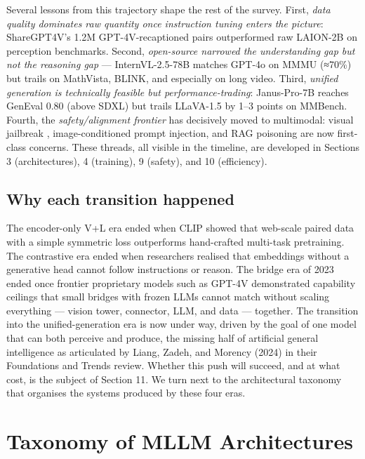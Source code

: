 \documentclass{article}
\begin{document}
Several lessons from this trajectory shape the rest of the survey. First, \emph{data quality dominates raw quantity once instruction tuning enters the picture}: ShareGPT4V's 1.2M GPT-4V-recaptioned pairs \citep{chen20242024} outperformed raw LAION-2B on perception benchmarks. Second, \emph{open-source narrowed the understanding gap but not the reasoning gap} --- InternVL-2.5-78B matches GPT-4o on MMMU (≈70\%) but trails on MathVista, BLINK, and especially on long video. Third, \emph{unified generation is technically feasible but performance-trading}: Janus-Pro-7B reaches GenEval 0.80 (above SDXL) but trails LLaVA-1.5 by 1--3 points on MMBench. Fourth, the \emph{safety/alignment frontier} has decisively moved to multimodal: visual jailbreak \citep{qi20242024}, image-conditioned prompt injection, and RAG poisoning are now first-class concerns. These threads, all visible in the timeline, are developed in Sections 3 (architectures), 4 (training), 9 (safety), and 10 (efficiency).

\subsection{Why each transition happened}\label{why-each-transition-happened}

The encoder-only V+L era ended when CLIP showed that web-scale paired data with a simple symmetric loss outperforms hand-crafted multi-task pretraining. The contrastive era ended when researchers realised that embeddings without a generative head cannot follow instructions or reason. The bridge era of 2023 ended once frontier proprietary models such as GPT-4V demonstrated capability ceilings that small bridges with frozen LLMs cannot match without scaling everything --- vision tower, connector, LLM, and data --- together. The transition into the unified-generation era is now under way, driven by the goal of one model that can both perceive and produce, the missing half of artificial general intelligence as articulated by Liang, Zadeh, and Morency (2024) in their Foundations and Trends review. Whether this push will succeed, and at what cost, is the subject of Section 11. We turn next to the architectural taxonomy that organises the systems produced by these four eras.

\section{Taxonomy of MLLM Architectures}\label{taxonomy-of-mllm-architectures}
\end{document}
